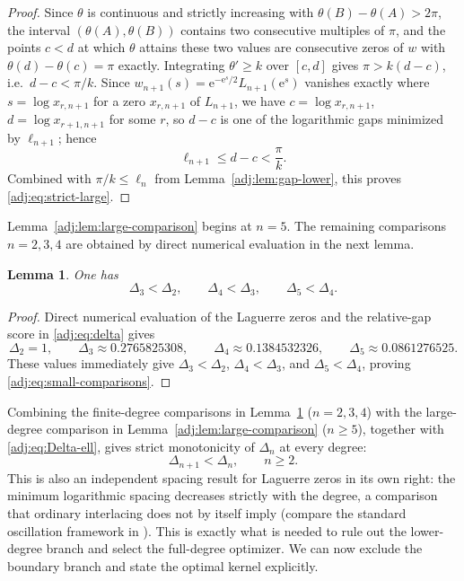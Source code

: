 \documentclass[11pt]{article}
\numberwithin{equation}{section}
\newtheorem{lemma}[theorem]{Lemma}
\theoremstyle{definition}
\theoremstyle{remark}
\newcommand{\e}{\mathrm e}
\begin{document}
\begin{proof}
Since $\theta$ is continuous and strictly increasing with
$\theta(B)-\theta(A)>2\pi$, the interval $(\theta(A),\theta(B))$ contains two
consecutive multiples of $\pi$, and the points $c<d$ at which $\theta$
attains these two values are consecutive zeros of $w$ with
$\theta(d)-\theta(c)=\pi$ exactly. Integrating $\theta'\geq k$ over $[c,d]$ gives $\pi>k(d-c)$, i.e.\ $d-c<\pi/k$. Since $w_{n+1}(s)=\e^{-\e^s/2}L_{n+1}(\e^s)$ vanishes exactly where $s=\log x_{r,n+1}$ for a zero $x_{r,n+1}$ of $L_{n+1}$, we have $c=\log x_{r,n+1}$, $d=\log x_{r+1,n+1}$ for some $r$, so $d-c$ is one of the logarithmic gaps minimized by $\ell_{n+1}$; hence
\[
 \ell_{n+1}\leq d-c<\frac\pi k.
\]
Combined with $\pi/k\leq\ell_n$ from Lemma~\ref{adj:lem:gap-lower}, this proves \eqref{adj:eq:strict-large}.
\end{proof}


Lemma~\ref{adj:lem:large-comparison} begins at $n=5$. The remaining comparisons $n=2,3,4$ are obtained by direct numerical evaluation in the next lemma.

\begin{lemma}\label{adj:lem:small-comparison}
One has
\begin{equation}\label{adj:eq:small-comparisons}
 \Delta_3<\Delta_2,
 \qquad
 \Delta_4<\Delta_3,
 \qquad
 \Delta_5<\Delta_4.
\end{equation}
\end{lemma}
\begin{proof}
Direct numerical evaluation of the Laguerre zeros and the relative-gap
score in \eqref{adj:eq:delta} gives
\[
 \Delta_2=1,\qquad
 \Delta_3\approx0.2765825308,\qquad
 \Delta_4\approx0.1384532326,\qquad
 \Delta_5\approx0.0861276525.
\]
These values immediately give
$\Delta_3<\Delta_2$, $\Delta_4<\Delta_3$, and
$\Delta_5<\Delta_4$, proving \eqref{adj:eq:small-comparisons}.
\end{proof}

Combining the finite-degree comparisons in Lemma~\ref{adj:lem:small-comparison} ($n=2,3,4$) with the large-degree comparison in Lemma~\ref{adj:lem:large-comparison} ($n\geq5$), together with \eqref{adj:eq:Delta-ell}, gives strict monotonicity of $\Delta_n$ at every degree:
\begin{equation}\label{adj:eq:Delta-monotone}
 \Delta_{n+1}<\Delta_n,
 \qquad n\geq2.
\end{equation}
This is also an independent spacing result for Laguerre zeros in its own right: the minimum logarithmic spacing decreases strictly with the degree, a comparison that ordinary interlacing does not by itself imply (compare the standard oscillation framework in \cite{szego}). This is exactly what is needed to rule out the lower-degree branch and select the full-degree optimizer. We can now exclude the boundary branch and state the optimal kernel explicitly.
\end{document}
